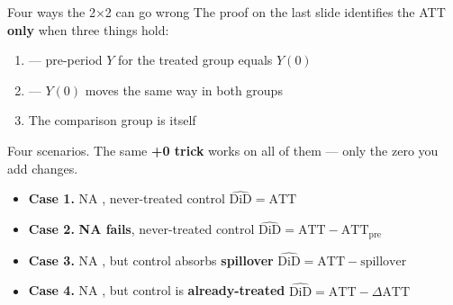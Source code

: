 \documentclass[aspectratio=169,11pt]{beamer}
\begin{document}
\begin{frame}{Four ways the 2$\times$2 can go wrong}
\footnotesize
The proof on the last slide identifies the ATT \textbf{only} when three things hold:
\begin{enumerate}\setlength\itemsep{2pt}
  \item[\textbf{(i)}]  --- pre-period $Y$ for the treated group equals $Y(0)$
  \item[\textbf{(ii)}]  --- $Y(0)$ moves the same way in both groups
  \item[\textbf{(iii)}] The comparison group is itself 
\end{enumerate}

\vspace{0.4em}
Four scenarios. The same \textbf{+0 trick} works on all of them --- only the zero you add changes.
\vspace{-0.3em}
\begin{itemize}\setlength\itemsep{2pt}
  \item \textbf{Case 1.}\; NA \checkmark, never-treated control \checkmark \hfill $\widehat{\text{DiD}} = \text{ATT}$
  \item \textbf{Case 2.}\; \textbf{NA fails}, never-treated control \hfill $\widehat{\text{DiD}} = \text{ATT} - \text{ATT}_{\text{pre}}$
  \item \textbf{Case 3.}\; NA \checkmark, but control absorbs \textbf{spillover} \hfill $\widehat{\text{DiD}} = \text{ATT} - \text{spillover}$
  \item \textbf{Case 4.}\; NA \checkmark, but control is \textbf{already-treated} \hfill $\widehat{\text{DiD}} = \text{ATT} - \Delta\text{ATT}$
\end{itemize}

\vspace{0.3em}
\end{frame}
\end{document}
